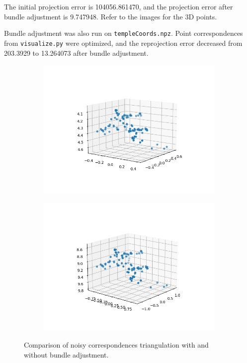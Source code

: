 \documentclass{article} %
\begin{document}
    The initial projection error is 104056.861470, and the projection error after bundle adjustment is 9.747948. Refer to the images for the 3D points.
    
    \smallskip
    Bundle adjustment was also run on \verb|templeCoords.npz|. Point correspondences from \verb|visualize.py| were optimized, and the reprojection error decreased from 203.3929 to 13.264073 after bundle adjustment.
    
    \begin{figure}[h]
        \begin{subfigure}[b]{0.5\textwidth}
            \includegraphics[width=\textwidth]{q5,3_init1.png}
        \end{subfigure}
        \begin{subfigure}[b]{0.5\textwidth}
            \includegraphics[width=\textwidth]{q5,3_opt1.png}
        \end{subfigure}
        \caption{Comparison of noisy correspondences triangulation with and without bundle adjustment.}
    \end{figure}
\end{document}
